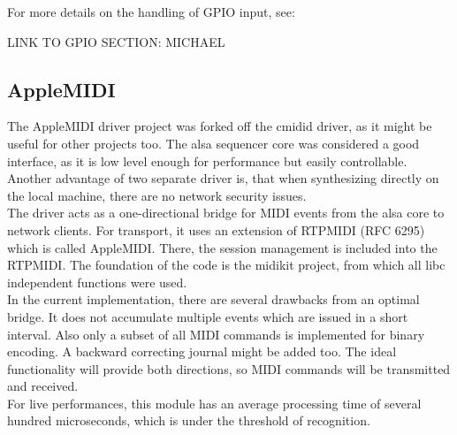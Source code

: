 \documentclass[paper=a4,fontsize=11pt,twocolumn,pagesize,bibtotoc]{scrartcl}
\begin{document}
For more details on the handling of GPIO input, see:

LINK TO GPIO SECTION: MICHAEL

\subsection{AppleMIDI}
\label{overview:applemidi}
The AppleMIDI driver project was forked off the cmidid driver, as it might be useful for other projects too. The alsa sequencer core was considered a good interface, as it is low level enough for performance but easily controllable. Another advantage of two separate driver is, that when synthesizing directly on the local machine, there are no network security issues.
\\
The driver acts as a one-directional bridge for MIDI events from the alsa core to network clients.
For transport, it uses an extension of RTPMIDI (RFC 6295) which is called AppleMIDI. There, the session management is included into the RTPMIDI.
The foundation of the code is the midikit project, from which all libc independent functions were used.
\\
In the current implementation, there are several drawbacks from an optimal bridge. It does not accumulate multiple events which are issued in a short interval. Also only a subset of all MIDI commands is implemented for binary encoding. A backward correcting journal might be added too. The ideal functionality will provide both directions, so MIDI commands will be transmitted and received.
\\
For live performances, this module has an average processing time of several hundred microseconds, which is under the threshold of recognition.
\end{document}
